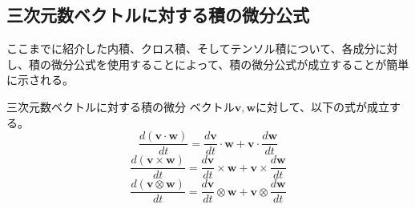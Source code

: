 \subsection{三次元数ベクトルに対する積の微分公式}
ここまでに紹介した内積、クロス積、そしてテンソル積について、各成分に対し、積の微分公式を使用することによって、積の微分公式が成立することが簡単に示される。
\begin{theorem*}{三次元数ベクトルに対する積の微分}
	ベクトル\(\boldsymbol{v},\boldsymbol{w}\)に対して、以下の式が成立する。
	\begin{equation}
		\frac{d(\boldsymbol{v}\cdot\boldsymbol{w})}{dt}=
		\frac{d\boldsymbol{v}}{dt}\cdot\boldsymbol{w}+\boldsymbol{v}\cdot\frac{d\boldsymbol{w}}{dt}
	\end{equation}
	\begin{equation}
		\frac{d(\boldsymbol{v}\times\boldsymbol{w})}{dt}=
		\frac{d\boldsymbol{v}}{dt}\times\boldsymbol{w}+\boldsymbol{v}\times\frac{d\boldsymbol{w}}{dt}
	\end{equation}
	\begin{equation}
		\frac{d(\boldsymbol{v}\otimes\boldsymbol{w})}{dt}=
		\frac{d\boldsymbol{v}}{dt}\otimes\boldsymbol{w}+\boldsymbol{v}\otimes\frac{d\boldsymbol{w}}{dt}
	\end{equation}
\end{theorem*}

